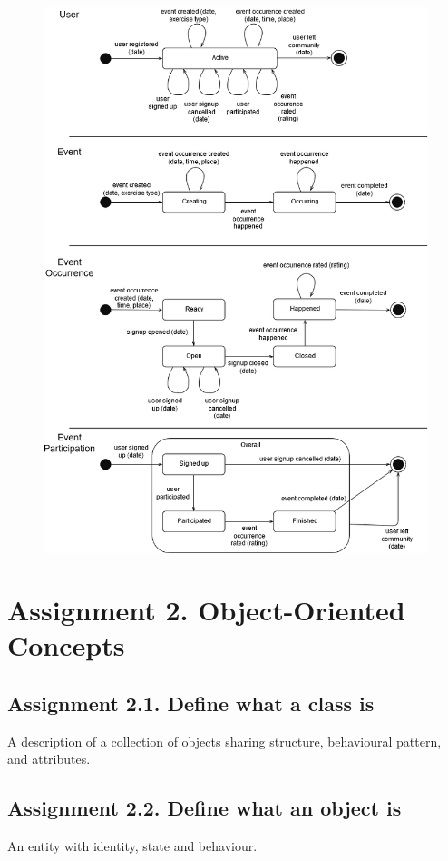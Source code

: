 \begin{figure}[H]
    \centering
    \includegraphics[width=\textwidth]{figures/assignment1-3statechartdiagrams2018.png}
\end{figure}


\section{Assignment 2. Object-Oriented Concepts}
\subsection{Assignment 2.1. Define what a class is}
A description of a collection of objects sharing structure, behavioural pattern, and attributes.

\subsection{Assignment 2.2. Define what an object is}
An entity with identity, state and behaviour.

